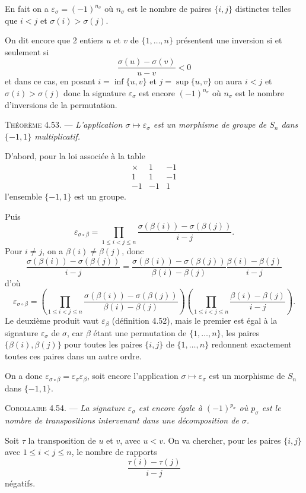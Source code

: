 En fait on a $\varepsilon_\sigma=(-1)^{n_\sigma}$ où $n_\sigma$ est le nombre de paires $\{i,j\}$ distinctes telles que $i<j$ et $\sigma(i)>\sigma(j)$.

On dit encore que 2 entiers $u$ et $v$ de $\{1,\ldots,n\}$ présentent une inversion si et seulement si
\[
\frac{\sigma(u)-\sigma(v)}{u-v}<0
\]
et dans ce cas, en posant $i=\inf\{u,v\}$ et $j=\sup\{u,v\}$ on aura $i<j$ et $\sigma(i)>\sigma(j)$ donc la signature $\varepsilon_\sigma$ est encore $(-1)^{n_\sigma}$ où $n_\sigma$ est le nombre d'inversions de la permutation.

\medskip\noindent\textsc{Théorème 4.53.} --- \emph{L'application $\sigma\mapsto\varepsilon_\sigma$ est un morphisme de groupe de $S_n$ dans $\{-1,1\}$ multiplicatif.}

D'abord, pour la loi associée à la table
\[
\begin{array}{c|cc}
\times&1&-1\\\hline
1&1&-1\\
-1&-1&1
\end{array}
\]
l'ensemble $\{-1,1\}$ est un groupe.

Puis
\[
\varepsilon_{\sigma\circ\beta}
=\prod_{1\le i<j\le n}
\frac{\sigma(\beta(i))-\sigma(\beta(j))}{i-j}.
\]
Pour $i\ne j$, on a $\beta(i)\ne\beta(j)$, donc
\[
\frac{\sigma(\beta(i))-\sigma(\beta(j))}{i-j}
=
\frac{\sigma(\beta(i))-\sigma(\beta(j))}{\beta(i)-\beta(j)}
\frac{\beta(i)-\beta(j)}{i-j}
\]
d'où
\[
\varepsilon_{\sigma\circ\beta}
=\left(\prod_{1\le i<j\le n}
\frac{\sigma(\beta(i))-\sigma(\beta(j))}{\beta(i)-\beta(j)}\right)
\left(\prod_{1\le i<j\le n}
\frac{\beta(i)-\beta(j)}{i-j}\right).
\]
Le deuxième produit vaut $\varepsilon_\beta$ (définition 4.52), mais le premier est égal à la signature $\varepsilon_\sigma$ de $\sigma$, car $\beta$ étant une permutation de $\{1,\ldots,n\}$, les paires $\{\beta(i),\beta(j)\}$ pour toutes les paires $\{i,j\}$ de $\{1,\ldots,n\}$ redonnent exactement toutes ces paires dans un autre ordre.

On a donc $\varepsilon_{\sigma\circ\beta}=\varepsilon_\sigma\varepsilon_\beta$, soit encore l'application $\sigma\mapsto\varepsilon_\sigma$ est un morphisme de $S_n$ dans $\{-1,1\}$. \bookend

\medskip\noindent\textsc{Corollaire 4.54.} --- \emph{La signature $\varepsilon_\sigma$ est encore égale à $(-1)^{p_\sigma}$ où $p_\sigma$ est le nombre de transpositions intervenant dans une décomposition de $\sigma$.}

Soit $\tau$ la transposition de $u$ et $v$, avec $u<v$. On va chercher, pour les paires $\{i,j\}$ avec $1\le i<j\le n$, le nombre de rapports
\[
\frac{\tau(i)-\tau(j)}{i-j}
\]
négatifs.

